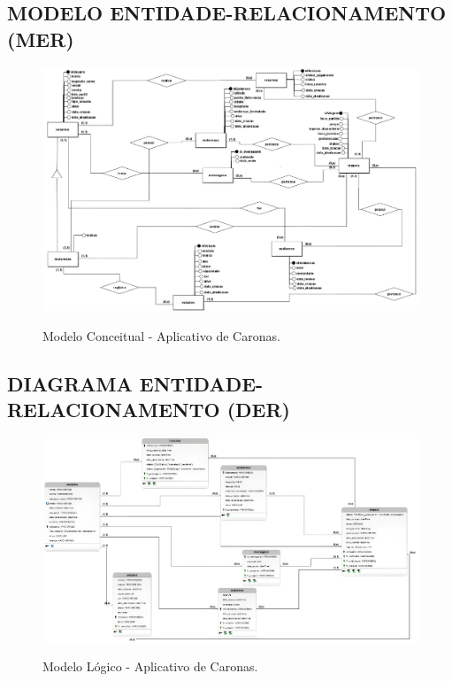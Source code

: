 \begin{anexosenv}


\begin{landscape}

	\chapter{MODELO ENTIDADE-RELACIONAMENTO (MER)}
	
	\begin{figure}[htb!]
		\centering
		\caption{Modelo Conceitual - Aplicativo de Caronas.}
		\includegraphics[width=1.45\textwidth]{img/ModeloConceitual.png} 
		\label{fig:modelo_conceitual_banco}
	\end{figure}
	
\end{landscape}


\begin{landscape}
	
	\chapter{DIAGRAMA ENTIDADE-RELACIONAMENTO (DER)}
	
	\begin{figure}[htb!]
		\centering
		\caption{Modelo Lógico - Aplicativo de Caronas.}
		\includegraphics[width=1.25\textwidth]{img/ModeloLogico.jpg}
		\label{fig:modelo_logico_banco}
	\end{figure}
	

\end{landscape}
\end{anexosenv}
